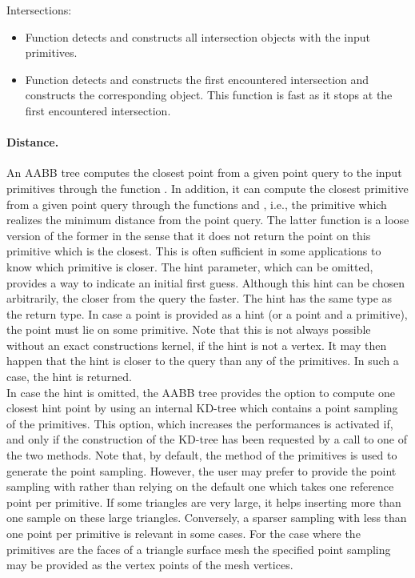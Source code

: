 Intersections:
\begin{itemize}
\item Function  detects and constructs all intersection objects with the input primitives.
\item Function  detects and constructs the first encountered intersection and constructs the corresponding object. This function is fast as it stops at the first encountered intersection.
\end{itemize}

\paragraph{Distance.} An AABB tree computes the closest point from a given point query to the input primitives through the function . In addition, it can compute the closest primitive from a given point query through the functions  and , i.e., the primitive which realizes the minimum distance from the point query. The latter function is a loose version of the former in the sense that it does not return the point on this primitive which is the closest. This is often sufficient in some applications to know which primitive is closer. The hint parameter, which can be omitted, provides a way to indicate an initial first guess. Although this hint can be chosen arbitrarily, the closer from the query the faster. The hint has the same type as the return type. In case a point is provided as a hint (or a point and a primitive), the point must lie on some primitive. Note that this is not always possible without an exact constructions kernel, if the hint is not a vertex. It may then happen that the hint is closer to the query than any of the primitives. In such a case, the hint is returned.\\

In case the hint is omitted, the AABB tree provides the option to compute one closest hint point by using an internal KD-tree which contains a point sampling of the primitives. This option, which increases the performances is activated if, and only if the construction of the KD-tree has been requested by a call to one of the two  methods. Note that, by default, the method  of the primitives is used to generate the point sampling. However, the user may prefer to provide the point sampling with  rather than relying on the default one which takes one reference point per primitive. If some triangles are very large, it helps inserting more than one sample on these large triangles. Conversely, a sparser sampling with less than one point per primitive is relevant in some cases. For the case where the primitives are the faces of a triangle surface mesh the specified point sampling may be provided as the vertex points of the mesh vertices.